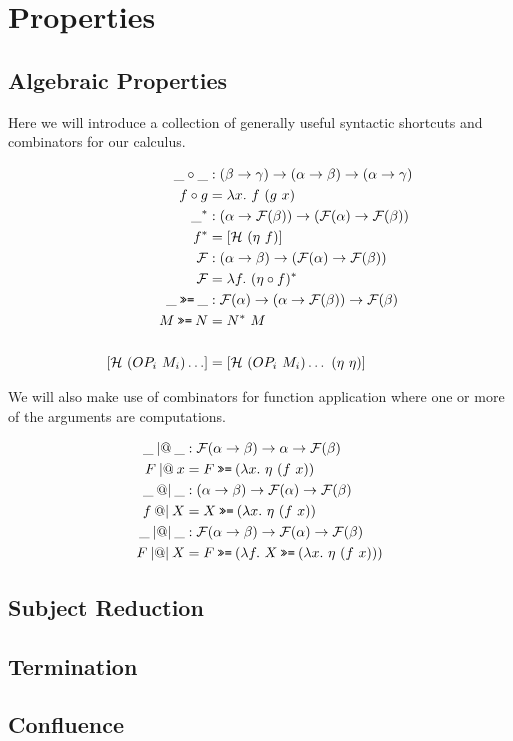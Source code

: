 \chapter{Properties}


\section{Algebraic Properties}

Here we will introduce a collection of generally useful syntactic shortcuts
and combinators for our calculus.

\begin{align*}
  \_ \circ \_ &: (\beta \to \gamma) \to (\alpha \to \beta) \to (\alpha \to \gamma) \\
  f \circ g &= \lambda x.\ f\ (g\ x) \\
  \_^* &: (\alpha \to \mathcal{F}(\beta)) \to (\mathcal{F}(\alpha) \to \mathcal{F}(\beta)) \\
  f^* &= [\mathcal{H}\ (\eta\ f)] \\
  \mathcal{F} &: (\alpha \to \beta) \to (\mathcal{F}(\alpha) \to \mathcal{F}(\beta)) \\
  \mathcal{F} &= \lambda f.\ (\eta \circ f)^* \\
  \_ \hsbind \_ &: \mathcal{F}(\alpha) \to (\alpha \to \mathcal{F}(\beta)) \to \mathcal{F}(\beta) \\
  M \hsbind N &= N^*\ M \\
  \\
  [\mathcal{H}\ (OP_i\ M_i)\ldots] &= [\mathcal{H}\ (OP_i\ M_i)\ldots\ (\eta\ \eta)]
\end{align*}

We will also make use of combinators for function application where one or
more of the arguments are computations.

\begin{align*}
  \_ \apl \_ &: \mathcal{F}(\alpha \to \beta) \to \alpha \to \mathcal{F}(\beta) \\
  F \apl x &= F \hsbind (\lambda x.\ \eta\ (f\ x)) \\
  \_ \apr \_ &: (\alpha \to \beta) \to \mathcal{F}(\alpha) \to \mathcal{F}(\beta) \\
  f \apr X &= X \hsbind (\lambda x.\ \eta\ (f\ x)) \\
  \_ \ap \_ &: \mathcal{F}(\alpha \to \beta) \to \mathcal{F}(\alpha) \to \mathcal{F}(\beta) \\
  F \ap X &= F \hsbind (\lambda f.\ X \hsbind (\lambda x.\ \eta\ (f\ x)))
\end{align*}


\section{Subject Reduction}

\section{Termination}

\section{Confluence}

